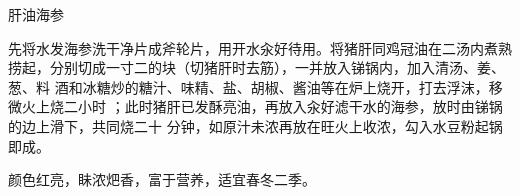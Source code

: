 \begin{recipe}{肝油海参}

\ingredients


\preparation

\step 先将水发海参洗干净片成斧轮片，用开水汆好待用。将猪肝同鸡冠油在二汤内煮熟
捞起，分别切成一寸二的块（切猪肝时去筋），一并放入锑锅内，加入清汤、姜、葱、料
酒和冰糖炒的糖汁、味精、盐、胡椒、酱油等在炉上烧开，打去浮沫，移微火上烧二小时
；此时猪肝已发酥亮油，再放入汆好滤干水的海参，放时由锑锅的边上滑下，共同烧二十
分钟，如原汁未浓再放在旺火上收浓，勾入水豆粉起锅即成。

\features

颜色红亮，眛浓𤆵香，富于营养，适宜春冬二季。

\end{recipe}

